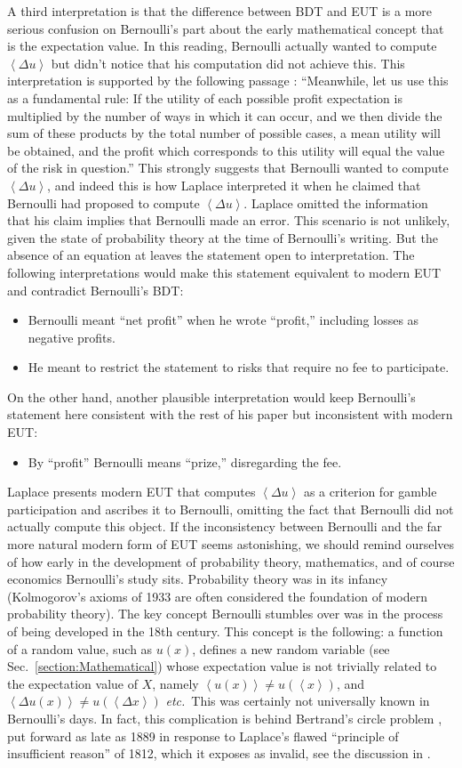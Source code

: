 \documentclass[pdftex]{article}
\newcommand{\etc}{{\it etc.}\ }
\newcommand{\ave}[1]{\left\langle#1 \right\rangle}
\newcommand{\bi}{\begin{itemize}}
\newcommand{\ei}{\end{itemize}}
\newcommand{\secref}[1]{Sec.~\ref{section:#1}}
\newcommand{\Dx}{{\Delta x}}
\newcommand{\Du}{\Delta u}
\begin{document}
A third interpretation is that the difference between BDT and EUT is a more serious confusion on Bernoulli's part about the early mathematical concept that is the expectation value. In this reading,  Bernoulli actually wanted to compute $\ave{\Du}$ but didn't notice that his computation did not achieve this. This interpretation is supported by the following passage \cite[p.~24]{Bernoulli1738}: ``Meanwhile, let us use this as a fundamental rule: If the utility of each possible profit expectation is multiplied by the number of ways in which it can occur, and we then divide the sum of these products by the total number of possible cases, a mean utility will be obtained, and the profit which corresponds to this utility will equal the value of the risk in question.'' This strongly suggests that Bernoulli wanted to compute $\ave{\Du}$, and indeed this is how Laplace interpreted it when he claimed that Bernoulli had proposed to compute $\ave{\Du}$. Laplace omitted the information that his claim implies that Bernoulli made an error. This scenario is not unlikely, given the state of probability theory at the time of Bernoulli's writing. But the absence of an equation at \cite[p.~24]{Bernoulli1738} leaves the statement open to interpretation. The following interpretations would make this statement equivalent to modern EUT and contradict Bernoulli's BDT: 
\bi
\item
Bernoulli meant ``net profit'' when he wrote ``profit,'' including losses as negative profits. 
\item
He meant to restrict the statement to risks that require no fee to participate.
\ei

On the other hand, another plausible interpretation would keep Bernoulli's statement here consistent with the rest of his paper but inconsistent with modern EUT:
\bi
\item
By ``profit'' Bernoulli means ``prize,'' disregarding the fee.
\ei

Laplace presents modern EUT that computes $\ave{\Du}$ as a criterion for gamble participation and ascribes it to Bernoulli, omitting the fact that Bernoulli did not actually compute this object. If the inconsistency between Bernoulli and the far more natural modern form of EUT seems astonishing, we should remind ourselves of how early in the development of probability theory, mathematics, and of course economics Bernoulli's study sits. Probability theory was in its infancy (Kolmogorov's axioms of 1933 \cite{Kolmogorov1933} are often considered the foundation of modern probability theory). The key concept Bernoulli stumbles over was in the process of being developed in the 18th century. This concept is the following:  a function of a random value, such as $u(x)$, defines a new random variable (see \secref{Mathematical}) whose expectation value is not trivially related to the expectation value of $X$, namely $\ave{u(x)}\neq u(\ave{x})$, and $\ave{\Du(x)}\neq u(\ave\Dx)$ \etc This was certainly not universally known in Bernoulli's days. In fact, this complication is behind Bertrand's circle problem \cite{Bertrand1889}, put forward as late as 1889 in response to Laplace's flawed ``principle of insufficient reason'' of 1812, which it exposes as invalid, see the discussion in \cite[p.~20]{vanKampen2007}.
\end{document}
